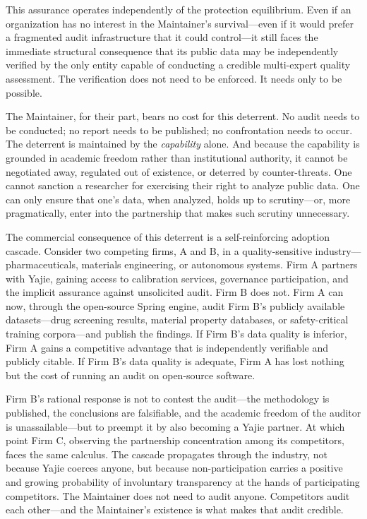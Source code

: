 \documentclass[12pt,a4paper]{article}
\theoremstyle{definition}
\theoremstyle{remark}
\begin{document}
This assurance operates independently of the protection equilibrium. Even if an organization has no interest in the Maintainer's survival—even if it would prefer a fragmented audit infrastructure that it could control—it still faces the immediate structural consequence that its public data may be independently verified by the only entity capable of conducting a credible multi-expert quality assessment. The verification does not need to be enforced. It needs only to be possible.

The Maintainer, for their part, bears no cost for this deterrent. No audit needs to be conducted; no report needs to be published; no confrontation needs to occur. The deterrent is maintained by the \textit{capability} alone. And because the capability is grounded in academic freedom rather than institutional authority, it cannot be negotiated away, regulated out of existence, or deterred by counter-threats. One cannot sanction a researcher for exercising their right to analyze public data. One can only ensure that one's data, when analyzed, holds up to scrutiny—or, more pragmatically, enter into the partnership that makes such scrutiny unnecessary.

The commercial consequence of this deterrent is a self-reinforcing adoption cascade. Consider two competing firms, A and B, in a quality-sensitive industry—pharmaceuticals, materials engineering, or autonomous systems. Firm A partners with Yajie, gaining access to calibration services, governance participation, and the implicit assurance against unsolicited audit. Firm B does not. Firm A can now, through the open-source Spring engine, audit Firm B's publicly available datasets—drug screening results, material property databases, or safety-critical training corpora—and publish the findings. If Firm B's data quality is inferior, Firm A gains a competitive advantage that is independently verifiable and publicly citable. If Firm B's data quality is adequate, Firm A has lost nothing but the cost of running an audit on open-source software.

Firm B's rational response is not to contest the audit—the methodology is published, the conclusions are falsifiable, and the academic freedom of the auditor is unassailable—but to preempt it by also becoming a Yajie partner. At which point Firm C, observing the partnership concentration among its competitors, faces the same calculus. The cascade propagates through the industry, not because Yajie coerces anyone, but because non-participation carries a positive and growing probability of involuntary transparency at the hands of participating competitors. The Maintainer does not need to audit anyone. Competitors audit each other—and the Maintainer's existence is what makes that audit credible.
\end{document}
